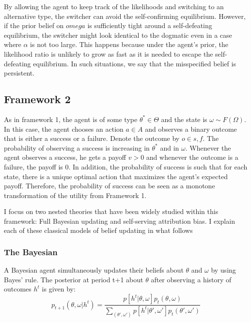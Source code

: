 \documentclass[
  12pt,
]{article}
\begin{document}
By allowing the agent to keep track of the likelihoods and switching to
an alternative type, the switcher can avoid the self-confirming
equilibrium. However, if the prior belief on \(omega\) is sufficiently
tight around a self-defeating equilibrium, the switcher might look
identical to the dogmatic even in a case where \(\alpha\) is not too
large. This happens because under the agent's prior, the likelihood
ratio is unlikely to grow as fast as it is needed to escape the
self-defeating equilibrium. In such situations, we say that the
misspecified belief is persistent.

\hypertarget{framework-2}{%
\subsection{Framework 2}\label{framework-2}}

As in framework 1, the agent is of some type \(\theta^* \in \Theta\) and
the state is \(\omega \sim F(\Omega)\). In this case, the agent chooses
an action \(a\in A\) and observes a binary outcome that is either a
success or a failure. Denote the outcome by \(o \in {s,f}\). The
probability of observing a success is increasing in \(\theta^*\) and in
\(\omega\). Whenever the agent observes a success, he gets a payoff
\(v>0\) and whenever the outcome is a failure, the payoff is 0. In
addition, the probability of success is such that for each state, there
is a unique optimal action that maximizes the agent's expected payoff.
Therefore, the probability of success can be seen as a monotone
transformation of the utility from Framework 1.

I focus on two nested theories that have been widely studied within this
framework: Full Bayesian updating and self-serving attribution bias. I
explain each of these classical models of belief updating in what
follows

\hypertarget{the-bayesian}{%
\subsubsection{The Bayesian}\label{the-bayesian}}

A Bayesian agent simultaneously updates their beliefs about \(\theta\)
and \(\omega\) by using Bayes' rule. The posterior at period t+1 about
\(\theta\) after observing a history of outcomes \(h^t\) is given by: \[
p_{t+1}(\theta, \omega| h^t) = \frac{p[h^t|\theta, \omega]p_t(\theta, \omega)}{\sum_{(\theta', \omega')}p[h^t|\theta', \omega']p_t(\theta', \omega')}
\]
\end{document}
